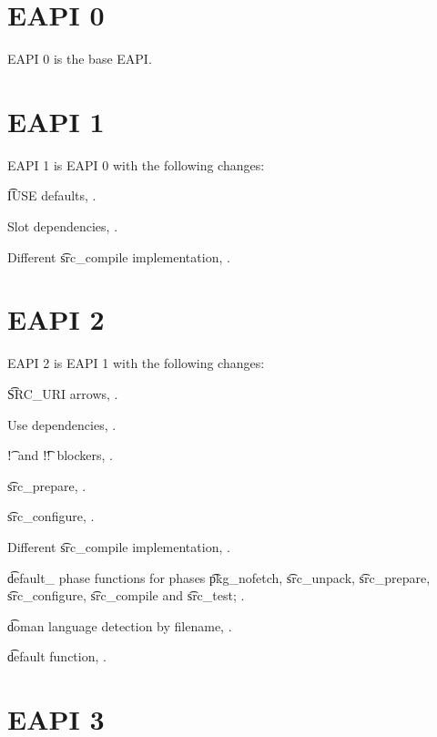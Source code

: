 \section*{EAPI 0}

EAPI 0 is the base EAPI.

\section*{EAPI 1}

EAPI 1 is EAPI 0 with the following changes:

\begin{compactitem}
\item \t{IUSE} defaults, .
\item Slot dependencies, .
\item Different \t{src_compile} implementation, .
\end{compactitem}

\section*{EAPI 2}

EAPI 2 is EAPI 1 with the following changes:

\begin{compactitem}
\item \t{SRC_URI} arrows, .
\item Use dependencies, .
\item \t{!}\ and \t{!!}\ blockers, .
\item \t{src_prepare}, .
\item \t{src_configure}, .
\item Different \t{src_compile} implementation, .
\item \t{default_} phase functions for phases \t{pkg_nofetch}, \t{src_unpack}, \t{src_prepare},
    \t{src_configure}, \t{src_compile} and \t{src_test}; .
\item \t{doman} language detection by filename, .
\item \t{default} function, .
\end{compactitem}

\section*{EAPI 3}

